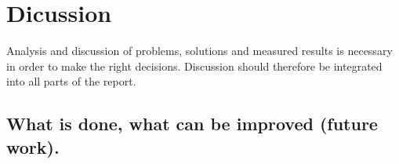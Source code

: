 \section{Dicussion}
Analysis and discussion of problems, solutions and measured results is necessary in order to make the right decisions. Discussion should therefore be integrated into all parts of the report. 
\subsection{What is done, what can be improved (future work).}